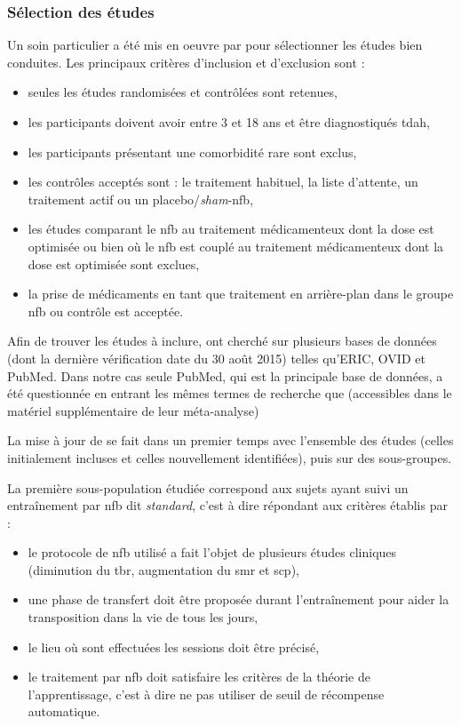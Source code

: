 \subsubsection{Sélection des études}
Un soin particulier a été mis en oeuvre par \citet{Cortese2016} pour sélectionner les études bien conduites. Les principaux critères d'inclusion
et d'exclusion sont \citep{Cortese2016} :
\begin{itemize}
\item seules les études randomisées et contrôlées sont retenues,
\item les participants doivent avoir entre 3 et 18 ans et être diagnostiqués \gls{tdah},
\item les participants présentant une comorbidité rare sont exclus,
\item les contrôles acceptés sont : le traitement habituel, la liste d'attente, un traitement actif ou un placebo/\textit{sham}-\gls{nfb},
\item les études comparant le \gls{nfb} au traitement médicamenteux dont la dose est optimisée ou bien où le \gls{nfb} est couplé au traitement médicamenteux
dont la dose est optimisée sont exclues,
\item la prise de médicaments en tant que traitement en arrière-plan dans le groupe \gls{nfb} ou contrôle est acceptée.
\end{itemize}

Afin de trouver les études à inclure, \citet{Cortese2016} ont cherché sur plusieurs bases de données (dont la dernière vérification
date du 30 août 2015) telles qu'ERIC, OVID et PubMed. Dans notre cas seule PubMed, qui est la principale base de données, a été questionnée en entrant 
les mêmes termes de recherche que \citet{Cortese2016} (accessibles dans le matériel supplémentaire de leur méta-analyse) 

La mise à jour de \citet{Cortese2016} se fait dans un premier temps avec l'ensemble des études (celles initialement incluses et celles nouvellement
identifiées), puis sur des sous-groupes.

La première sous-population étudiée correspond aux sujets ayant suivi un entraînement par \gls{nfb} dit \emph{standard}, c'est à dire répondant aux critères 
établis par \citet{Arns2014} :
\begin{itemize}
\item le protocole de \gls{nfb} utilisé a fait l'objet de plusieurs études cliniques (diminution du \gls{tbr}, augmentation du \gls{smr} et \gls{scp}),
\item une phase de transfert doit être proposée durant l'entraînement pour aider la transposition dans la vie de tous les jours,
\item le lieu où sont effectuées les sessions doit être précisé,
\item le traitement par \gls{nfb} doit satisfaire les critères de la théorie de l'apprentissage, c'est à dire ne pas utiliser de seuil de récompense automatique.
\end{itemize}

